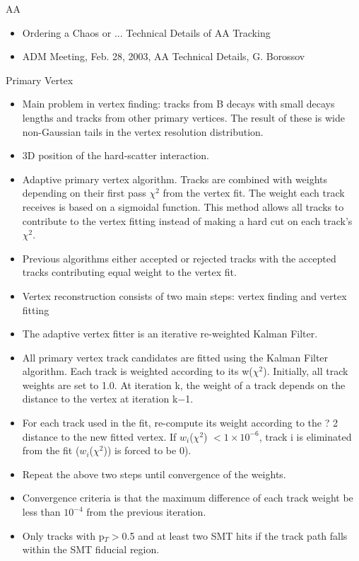 AA 
\begin{itemize}
\item Ordering a Chaos or ... Technical Details of AA Tracking
\item ADM Meeting, Feb. 28, 2003, AA Technical Details, G. Borossov
\end{itemize}



Primary Vertex
\begin{itemize}
\item Main problem in vertex finding: tracks from B decays with small decays lengths and tracks from other primary vertices. The result of these is wide non-Gaussian tails in the vertex resolution distribution.
\item 3D position of the hard-scatter interaction.
\item Adaptive primary vertex algorithm. Tracks are combined with weights depending on their first pass $\chi^{2}$ from the vertex fit. The weight each track receives is based on a sigmoidal function. This method allows all tracks to contribute to the vertex fitting instead of making a hard cut on each track's $\chi^{2}$.
\item Previous algorithms either accepted or rejected tracks with the accepted tracks contributing equal weight to the vertex fit.
\item Vertex reconstruction consists of two main steps: vertex finding and vertex fitting
\item The adaptive vertex fitter is an iterative re-weighted Kalman Filter.
\item All primary vertex track candidates are fitted using the Kalman Filter algorithm. Each track is weighted according to its w($\chi^{2}$). Initially, all track weights are set to 1.0. At iteration k, the weight of a track depends on the distance to the vertex at iteration k$-$1.
\item For each track used in the fit, re-compute its weight according to the ? 2 distance to the new fitted vertex. If $w_{i}$($\chi^{2}$) $< 1 \times 10^{-6}$, track i is eliminated from the fit ($w_{i}$($\chi^{2}$)) is forced to be 0). 
\item Repeat the above two steps until convergence of the weights. 
\item Convergence criteria is that the maximum difference of each track weight be less than $10^{-4}$ from the previous iteration.
\item Only tracks with p$_{T} > $0.5 and at least two SMT hits if the track path falls within the SMT fiducial region.

\end{itemize}

